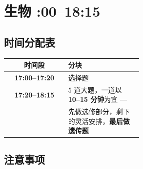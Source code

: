 \chapter{生物 :00--18:15}

\section{时间分配表}

\begin{center}
\begin{tabular}{@{} >{\bfseries}c p{0.55\linewidth} @{}}
    \toprule
    时间段 & 分块 \\
    \midrule
    17:00--17:20 & 选择题 \\
    17:20--18:15 & 5 道大题，一道以 \textbf{10--15 分钟}为宜 --- \\
     & 先做选修部分，剩下的灵活安排，\textbf{最后做遗传题} \\
    \bottomrule
\end{tabular}
\end{center}

\section{注意事项}

